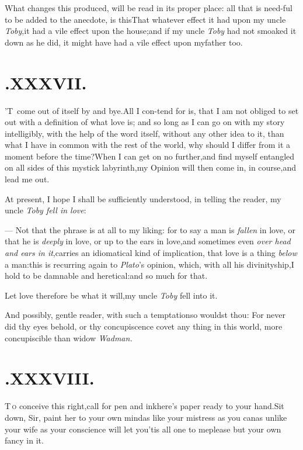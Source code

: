 \documentclass{article}
\begin{document}
What changes this produced, will be read in its proper place:
all that is need-\pb ful to be added to the anecdote, is
this\break\tsh That whatever effect it had upon my uncle
\textit{Toby},\tsh it had a vile effect upon the
house;\tsh and if my uncle \textit{Toby} had not smoaked it
down as he did, it might have had a vile effect upon my\break father
too.

\medskip

\section{.\enspace XXXVII.}

\lettrine{\Tsk ’T}{\,} come out of itself\break
by and bye.\tsk All I con-\break tend for is, that I am
not obliged to set out with a definition of what love is; and so
long as I can go on with my story intelligibly, with the help of
the word itself, without any other idea to it, than what I have in
common with the rest of the world, why should I differ from it
a moment before the time?\tsh When I\pb
can get
on no further,\tsk and find myself entangled on all sides of this
mystick labyrinth,\tsk my Opinion will then come in, in
course,\tsk and lead me out.

At present, I hope I shall be sufficiently understood, in
telling the reader, my uncle \textit{Toby fell in love}:

— Not that the phrase is at all to my liking: for to say a
man is \textit{fallen} in love,\break
\tsk or that he is \textit{deeply} in love,
\tsk or up to the ears in love,\tsk and sometimes even
\textit{over head and ears in it},\tsk carries an idiomatical kind
of implication, that love is a thing \textit{below} a man:\tsk this
is recurring again to \textit{Plato}’s opinion, which, with all
his divinityship,\tsk I hold to be damnable and
heretical:\tsk and so much for that.

Let love therefore be what it will,\tsk my uncle \textit{Toby}
fell into it.

\newpage
\tsh And possibly, gentle reader, with such a
temptation\tsk so wouldst thou: For never did thy eyes behold, or
thy concupiscence covet any thing in this world, more concupiscible than widow
\textit{Wadman.}

\section{.\enspace XXXVIII.}

\lettrine{T}{\,o} conceive this right,\tsk call
for pen and ink\tsk here’s paper ready to your
hand.\tsh Sit down, Sir, paint her to your own
mind\tsh as like your mistress as you can\tsh as
unlike your wife as your conscience will let you\tsk ’tis
all one to me\tsh please but your own fancy in it.
\end{document}
